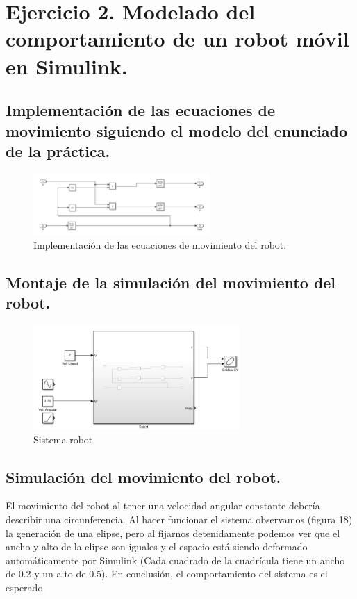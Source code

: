 \documentclass[a4paper, 12pt]{article}
\begin{document}
    \newpage
    
	\section{Ejercicio 2. Modelado del comportamiento de un robot móvil en Simulink.}
	
	\subsection{Implementación de las ecuaciones de movimiento siguiendo el modelo del enunciado de la práctica.}

    \begin{figure}[htp!]
	\centering
		\includegraphics[width=0.6\textwidth]{figures/Parte2Ej2p1.png}
		\caption{Implementación de las ecuaciones de movimiento del robot.}
	\end{figure}

    \subsection{Montaje de la simulación del movimiento del robot.}
        
    \begin{figure}[htp!]
	\centering
		\includegraphics[width=0.7\textwidth]{figures/Parte2Ej2p2f1.png}
		\caption{Sistema robot.}
	\end{figure}
    \newpage
    \subsection{Simulación del movimiento del robot.}
    
    El movimiento del robot al tener una velocidad angular constante debería describir una circunferencia. Al hacer funcionar el sistema observamos (figura 18) la generación de una elipse, pero al fijarnos detenidamente podemos ver que el ancho y alto de la elipse son iguales y el espacio está siendo deformado automáticamente por Simulink (Cada cuadrado de la cuadrícula tiene un ancho de 0.2 y un alto de 0.5). En conclusión, el comportamiento del sistema es el esperado.
        
\end{document}
